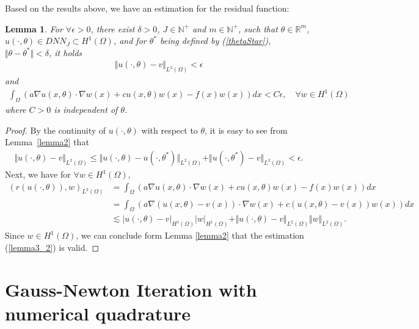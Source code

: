 \documentclass[a4paper, 11pt]{article}
\numberwithin{equation}{section}
\newtheorem{lemma}{\textbf{Lemma}}
\begin{document}
\quad\quad Based on the results above, we have an estimation for the residual function:
\begin{lemma}\label{lemma3}
For $\forall \epsilon > 0$, there exist $\delta > 0$, $J\in \mathbb{N}^{+}$ and $m\in \mathbb{N}^{+}$, 
such that $\theta\in \mathbb{R}^m$, $u(\cdot,\theta) \in DNN_J\subset H^1(\Omega)$, and for $ \theta^*$ being defined by (\ref{thetaStar}), $
\Vert \theta-\theta^* \Vert < \delta$, it holds 
\begin{align}\label{lemma3_1}
\Vert u(\cdot,\theta) -v \Vert_{L^2(\Omega)} <\epsilon 
\end{align}
and
\begin{align}\label{lemma3_2}
\int_{\Omega} \left(a\nabla u(x,\theta) \cdot \nabla w(x) + cu(x,\theta) w(x) - f(x) w(x) \right) dx < C \epsilon,\quad \forall w \in H^1(\Omega)
\end{align}
where $C >0$ is independent of $\theta$.
\end{lemma}
\begin{proof}
By the continuity of $u(\cdot,\theta)$ with respect to $\theta$, it is easy to see from Lemma~\ref{lemma2} that 
\begin{align}\label{lemma3one}
\Vert u(\cdot,\theta) -v \Vert_{L^2(\Omega)} \leq \Vert u(\cdot,\theta)-u(\cdot,\theta^*) \Vert_{L^2(\Omega)} + \Vert u(\cdot,\theta^*) - v \Vert_{L^2(\Omega)} < \epsilon.
\end{align}
Next, we have for $\forall w \in H^1(\Omega)$,
\begin{align}
\left( r(u(\cdot,\theta)), w \right)_{L^2(\Omega)} &= \int_{\Omega} \left(a\nabla u(x,\theta) \cdot \nabla w(x) + c u(x,\theta) w(x) - f(x) w(x) \right) dx \\ 
&= \int_{\Omega} \left( a\nabla (u(x,\theta) - v(x)) \cdot \nabla w(x) + c (u(x,\theta) - v(x)) w(x) \right) dx\\ 
& \lesssim \big | u(\cdot,\theta) -v \big |_{H^1(\Omega)} \big | w \big |_{H^1(\Omega)} + \Vert u(\cdot,\theta) -v \Vert_{L^2(\Omega)} \Vert w \Vert_{L^2(\Omega)}. 
\end{align}
Since $w \in H^1(\Omega)$, we can conclude form Lemma \ref{lemma2} that the estimation (\ref{lemma3_2}) is valid.
\end{proof}



\section{Gauss-Newton Iteration with numerical quadrature}
\end{document}
